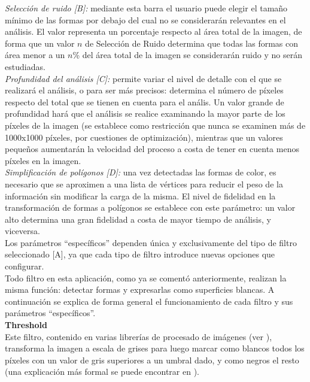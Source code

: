 		\noindent\textit{Selección de ruido [B]:} mediante esta barra el usuario puede elegir el tamaño mínimo de las formas por debajo del cual no se considerarán relevantes en el análisis. El valor representa un porcentaje respecto al área total de la imagen, de forma que un valor $n$ de Selección de Ruido determina que todas las formas con área menor a un $n$\% del área total de la imagen se considerarán ruido y no serán estudiadas.\\
		
		\noindent\textit{Profundidad del análisis [C]:} permite variar el nivel de detalle con el que se realizará el análisis, o para ser más precisos: determina el número de píxeles respecto del total que se tienen en cuenta para el anális. Un valor grande de profundidad hará que el análisis se realice examinando la mayor parte de los píxeles de la imagen (se establece como restricción que nunca se examinen más de 1000x1000 píxeles, por cuestiones de optimización), mientras que un valores pequeños aumentarán la velocidad del proceso a costa de tener en cuenta menos píxeles en la imagen.\\
		
		\noindent\textit{Simplificación de polígonos [D]:} una vez detectadas las formas de color, es necesario que se aproximen a una lista de vértices para reducir el peso de la información sin modificar la carga de la misma. El nivel de fidelidad en la transformación de formas a polígonos se establece con este parámetro: un valor alto determina una gran fidelidad a costa de mayor tiempo de análisis, y viceversa.\\

		
		\vspace{0.2in}Los parámetros ``específicos'' dependen única y exclusivamente del tipo de filtro seleccionado [A], ya que cada tipo de filtro introduce nuevas opciones que configurar. \\
		
		Todo filtro en esta aplicación, como ya se comentó anteriormente, realizan la misma función: detectar formas y expresarlas como superficies blancas. A continuación se explica de forma general el funcionamiento de cada filtro y sus parámetros ``específicos''.\\
		
	\noindent\textbf{Threshold}\\
		
		Este filtro, contenido en varias librerías de procesado de imágenes (ver \cite{opencvDoc}), transforma la imagen a escala de grises para luego marcar como blancos todos los píxeles con un valor de gris superiores a un umbral dado, y como negros el resto (una explicación más formal se puede encontrar en \cite{pajares}).\\
		
